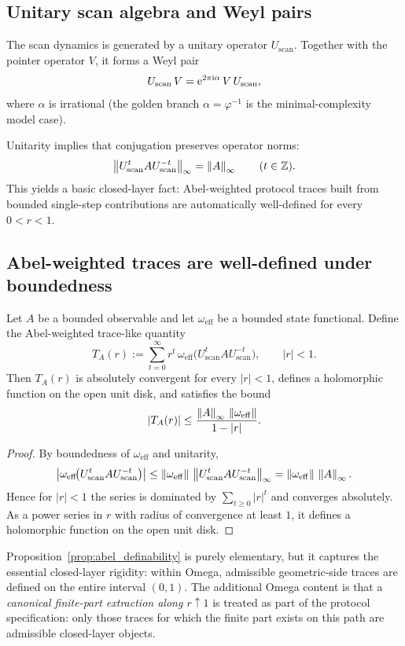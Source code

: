 \subsection{Unitary scan algebra and Weyl pairs}
\label{sec:axiom_O6}

\begin{axiom}
\label{ax:O6}
The scan dynamics is generated by a unitary operator $U_{\mathrm{scan}}$.
Together with the pointer operator $V$, it forms a Weyl pair
\[
U_{\mathrm{scan}}\,V=\mathrm{e}^{2\pi \mathrm{i} \alpha}\,V\,U_{\mathrm{scan}},
\]
where $\alpha$ is irrational (the golden branch $\alpha=\varphi^{-1}$ is the minimal-complexity model case).
\end{axiom}

Unitarity implies that conjugation preserves operator norms:
\[
\left\lVert U_{\mathrm{scan}}^t A U_{\mathrm{scan}}^{-t}\right\rVert_{\infty}=\left\lVert A\right\rVert_{\infty}\qquad (t\in\mathbb{Z}).
\]
This yields a basic closed-layer fact: Abel-weighted protocol traces built from bounded single-step contributions are automatically well-defined for every $0<r<1$.

\subsection{Abel-weighted traces are well-defined under boundedness}
\label{sec:abel_trace_defined}

\begin{proposition}
\label{prop:abel_definability}
Let $A$ be a bounded observable and let $\omega_{\mathrm{eff}}$ be a bounded state functional.
Define the Abel-weighted trace-like quantity
\[
T_A(r):=\sum_{t=0}^{\infty} r^t\,\omega_{\mathrm{eff}}\!\bigl(U_{\mathrm{scan}}^t A U_{\mathrm{scan}}^{-t}\bigr),
\qquad |r|<1.
\]
Then $T_A(r)$ is absolutely convergent for every $|r|<1$, defines a holomorphic function on the open unit disk, and satisfies the bound
\[
|T_A(r)|\le \frac{\left\lVert A\right\rVert_{\infty}\,\left\lVert \omega_{\mathrm{eff}}\right\rVert}{1-|r|}.
\]
\end{proposition}

\begin{proof}
By boundedness of $\omega_{\mathrm{eff}}$ and unitarity,
\[
\left|\omega_{\mathrm{eff}}\!\bigl(U_{\mathrm{scan}}^t A U_{\mathrm{scan}}^{-t}\bigr)\right|
\le
\left\lVert \omega_{\mathrm{eff}}\right\rVert\,\left\lVert U_{\mathrm{scan}}^t A U_{\mathrm{scan}}^{-t}\right\rVert_{\infty}
=\left\lVert \omega_{\mathrm{eff}}\right\rVert\,\left\lVert A\right\rVert_{\infty}.
\]
Hence for $|r|<1$ the series is dominated by $\sum_{t\ge 0} |r|^t$ and converges absolutely.
As a power series in $r$ with radius of convergence at least $1$, it defines a holomorphic function on the open unit disk.
\end{proof}

Proposition~\ref{prop:abel_definability} is purely elementary, but it captures the essential closed-layer rigidity: within Omega, admissible geometric-side traces are defined on the entire interval $(0,1)$.
The additional Omega content is that a \emph{canonical finite-part extraction along $r\uparrow 1$} is treated as part of the protocol specification: only those traces for which the finite part exists on this path are admissible closed-layer objects.


